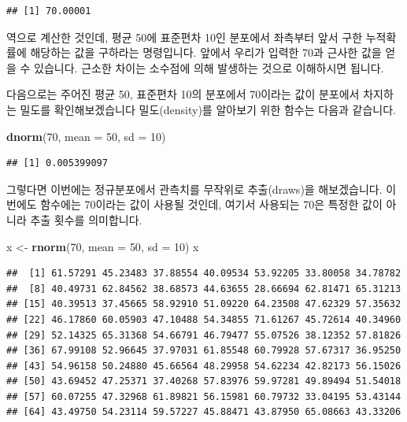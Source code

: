 \documentclass[]{book}
\newenvironment{Shaded}{\begin{snugshade}}{\end{snugshade}}
\newcommand{\DataTypeTok}[1]{\textcolor[rgb]{0.13,0.29,0.53}{#1}}
\newcommand{\DecValTok}[1]{\textcolor[rgb]{0.00,0.00,0.81}{#1}}
\newcommand{\KeywordTok}[1]{\textcolor[rgb]{0.13,0.29,0.53}{\textbf{#1}}}
\newcommand{\NormalTok}[1]{#1}
\newcommand{\StringTok}[1]{\textcolor[rgb]{0.31,0.60,0.02}{#1}}
\begin{document}
\begin{verbatim}
## [1] 70.00001
\end{verbatim}

역으로 계산한 것인데, 평균 50에 표준편차 10인 분포에서 좌측부터 앞서 구한 누적확률에 해당하는 값을 구하라는 명령입니다. 앞에서 우리가 입력한 70과 근사한 값을 얻을 수 있습니다. 근소한 차이는 소수점에 의해 발생하는 것으로 이해하시면 됩니다.

다음으로는 주어진 평균 50, 표준편차 10의 분포에서 70이라는 값이 분포에서 차지하는 밀도를 확인해보겠습니다 밀도(density)를 알아보기 위한 함수는 다음과 같습니다.

\begin{Shaded}
\begin{Highlighting}[]
\KeywordTok{dnorm}\NormalTok{(}\DecValTok{70}\NormalTok{, }\DataTypeTok{mean =} \DecValTok{50}\NormalTok{, }\DataTypeTok{sd =} \DecValTok{10}\NormalTok{)}
\end{Highlighting}
\end{Shaded}

\begin{verbatim}
## [1] 0.005399097
\end{verbatim}

그렇다면 이번에는 정규분포에서 관측치를 무작위로 추출(draws)을 해보겠습니다. 이번에도 함수에는 70이라는 값이 사용될 것인데, 여기서 사용되는 70은 특정한 값이 아니라 추출 횟수를 의미합니다.

\begin{Shaded}
\begin{Highlighting}[]
\NormalTok{x <-}\StringTok{ }\KeywordTok{rnorm}\NormalTok{(}\DecValTok{70}\NormalTok{, }\DataTypeTok{mean =} \DecValTok{50}\NormalTok{, }\DataTypeTok{sd =} \DecValTok{10}\NormalTok{)}
\NormalTok{x}
\end{Highlighting}
\end{Shaded}

\begin{verbatim}
##  [1] 61.57291 45.23483 37.88554 40.09534 53.92205 33.80058 34.78782
##  [8] 40.49731 62.84562 38.68573 44.63655 28.66694 62.81471 65.31213
## [15] 40.39513 37.45665 58.92910 51.09220 64.23508 47.62329 57.35632
## [22] 46.17860 60.05903 47.10488 54.34855 71.61267 45.72614 40.34960
## [29] 52.14325 65.31368 54.66791 46.79477 55.07526 38.12352 57.81826
## [36] 67.99108 52.96645 37.97031 61.85548 60.79928 57.67317 36.95250
## [43] 54.96158 50.24880 45.66564 48.29958 54.62234 42.82173 56.15026
## [50] 43.69452 47.25371 37.40268 57.83976 59.97281 49.89494 51.54018
## [57] 60.07255 47.32968 61.89821 56.15981 60.79732 33.04195 53.43144
## [64] 43.49750 54.23114 59.57227 45.88471 43.87950 65.08663 43.33206
\end{verbatim}
\end{document}
